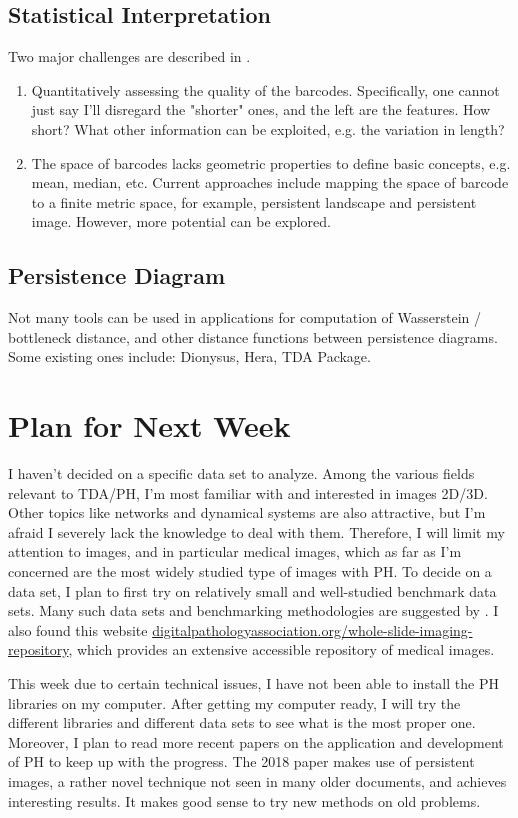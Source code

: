 \documentclass[10pt,a4paper]{article}
\begin{document}
\subsection{Statistical Interpretation}
Two major challenges are described in \cite{Otter2017}.
\begin{enumerate}
	\item Quantitatively assessing the quality of the barcodes. Specifically, one cannot just say I'll disregard the "shorter" ones, and the left are the features. How short? What other information can be exploited, e.g. the variation in length?
	\item The space of barcodes lacks geometric properties to define basic concepts, e.g. mean, median, etc. Current approaches include mapping the space of barcode to a finite metric space, for example, persistent landscape and persistent image. However, more potential can be explored.
\end{enumerate}
\subsection{Persistence Diagram}
Not many tools can be used in applications for computation of Wasserstein / bottleneck distance, and other distance functions between persistence diagrams. Some existing ones include: Dionysus, Hera, TDA Package.

\section{Plan for Next Week}
I haven't decided on a specific data set to analyze. Among the various fields relevant to TDA/PH, I'm most familiar with and interested in images 2D/3D. Other topics like networks and dynamical systems are also attractive, but I'm afraid I severely lack the knowledge to deal with them. Therefore, I will limit my attention to images, and in particular medical images, which as far as I'm concerned are the most widely studied type of images with PH. To decide on a data set, I plan to first try on relatively small and well-studied benchmark data sets. Many such data sets and benchmarking methodologies are suggested by \cite{Otter2017}. I also found this website \url{digitalpathologyassociation.org/whole-slide-imaging-repository}, which provides an extensive accessible repository of medical images.\par

This week due to certain technical issues, I have not been able to install the PH libraries on my computer. After getting my computer ready, I will try the different libraries and different data sets to see what is the most proper one. Moreover, I plan to read more recent papers on the application and development of PH to keep up with the progress. The 2018 paper \cite{Chittajallu2018} makes use of persistent images, a rather novel technique not seen in many older documents, and achieves interesting results. It makes good sense to try new methods on old problems.\par
\end{document}
